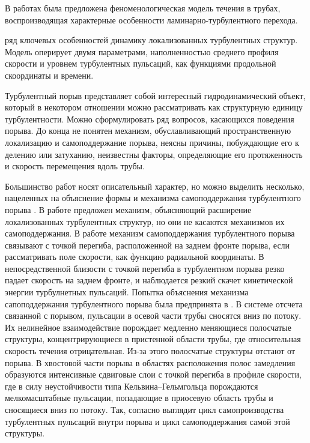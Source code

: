 В работах \cite{Barkley2015, Barkley2016} была предложена феноменологическая модель течения в трубах, воспроизводящая характерные особенности ламинарно-турбулентного перехода. 

ряд ключевых особенностей динамику локализованных турбулентных структур. Модель оперирует двумя параметрами, наполненностью среднего профиля скорости и уровнем турбулентных пульсаций, как функциями продольной скоординаты и времени. 

Турбулентный порыв представляет собой интересный гидродинамический объект, который в некотором отношении можно рассматривать как структурную единицу турбулентности. Можно сформулировать ряд вопросов, касающихся поведения порыва. До конца не понятен механизм, обуславливающий пространственную локализацию и самоподдержание порыва, неясны причины, побуждающие его к делению или затуханию, неизвестны факторы, определяющие его протяженность и скорость перемещения вдоль трубы.

Большинство работ носят описательный характер, но можно выделить несколько, нацеленных на объяснение формы и механизма самоподдержания турбулентного порыва \cite{Duguet2010, Hof2010, Shimizu2009}. В работе \cite{Duguet2010} предложен механизм, объясняющий расширение локализованных турбулентных структур, но они не касаются механизмов их самоподдержания. В работе \cite{Hof2010} механизм самоподдержания турбулентного порыва связывают с точкой перегиба, расположенной на заднем фронте порыва, если рассматривать поле скорости, как функцию радиальной координаты. В непосредственной близости с точкой перегиба в турбулентном порыва резко падает скорость на заднем фронте, и наблюдается резкий скачет кинетической энергии турбулнетных пульсаций. 
Попытка объяснения механизма сапоподдержания турбулентного порыва была предпринята в \cite{Shimizu2009}. В системе отсчета связанной с порывом, пульсации в осевой части трубы сносятся вниз по потоку. Их нелинейное взаимодействие порождает медленно меняющиеся полосчатые структуры, концентрирующиеся в пристенной области трубы, где относительная скорость течения отрицательная. Из-за этого полосчатые структуры отстают от порыва. В хвостовой части порыва в областях расположения полос замедления образуются интенсивные сдвиговые слои с точкой перегиба в профиле скорости, где в силу неустойчивости типа Кельвина--Гельмгольца порождаются мелкомасштабные пульсации, попадающие в приосевую область трубы и сносящиеся вниз по потоку. Так, согласно \cite{Shimizu2009} выглядит цикл самопроизводства турбулентных пульсаций внутри порыва и цикл самоподдержания самой этой структуры.


